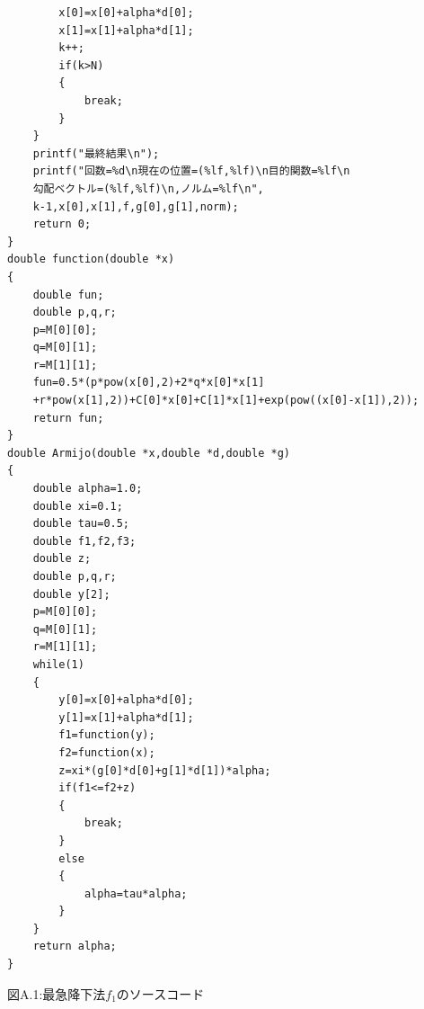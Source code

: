 \documentclass[12pt]{jarticle}
\begin{document}
\begin{framed}
\begin{verbatim}
        x[0]=x[0]+alpha*d[0];
        x[1]=x[1]+alpha*d[1];
        k++;
        if(k>N)
        {
            break;
        }
    }
    printf("最終結果\n");
    printf("回数=%d\n現在の位置=(%lf,%lf)\n目的関数=%lf\n
    勾配ベクトル=(%lf,%lf)\n,ノルム=%lf\n",
    k-1,x[0],x[1],f,g[0],g[1],norm);
    return 0;
}
double function(double *x)
{
    double fun;
    double p,q,r;
    p=M[0][0];
    q=M[0][1];
    r=M[1][1];
    fun=0.5*(p*pow(x[0],2)+2*q*x[0]*x[1]
    +r*pow(x[1],2))+C[0]*x[0]+C[1]*x[1]+exp(pow((x[0]-x[1]),2));
    return fun;
}
double Armijo(double *x,double *d,double *g)
{
    double alpha=1.0;
    double xi=0.1;
    double tau=0.5;
    double f1,f2,f3;
    double z;
    double p,q,r;
    double y[2];
    p=M[0][0];
    q=M[0][1];
    r=M[1][1];    
    while(1)
    {
        y[0]=x[0]+alpha*d[0];
        y[1]=x[1]+alpha*d[1];
        f1=function(y);
        f2=function(x);
        z=xi*(g[0]*d[0]+g[1]*d[1])*alpha;
        if(f1<=f2+z)
        {
            break;
        }
        else
        {
            alpha=tau*alpha;
        }
    }
    return alpha;
} 
    \end{verbatim}
\end{framed}
\begin{center}
    図A.1:最急降下法$f_1$のソースコード
\end{center}
\end{document}
